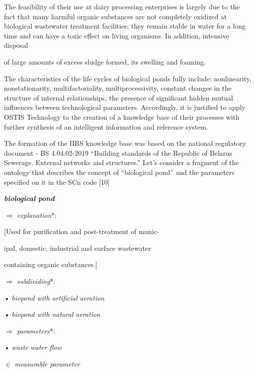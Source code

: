 \documentclass[10pt,final]{article}
\begin{document}
\begin{multicols}{2}
The feasibility of their use at dairy processing enterprises is largely due to the fact that many harmful organic
substances are not completely oxidized at biological
wastewater treatment facilities; they remain stable in
water for a long time and can have a toxic effect on
living organisms. In addition, intensive disposal

\columnbreak
\noindent of large amounts of excess sludge formed, its swelling
and foaming.

The characteristics of the life cycles of biological
ponds fully include: nonlinearity, nonstationarity, multifactoriality, multiprocessivity, constant changes in the
structure of internal relationships, the presence of significant hidden mutual influences between technological
parameters. Accordingly, it is justified to apply OSTIS
Technology to the creation of a knowledge base of
their processes with further synthesis of an intelligent
information and reference system.

The formation of the IIRS knowledge base was based
on the national regulatory document - BS 4.04.02-2019
“Building standards of the Republic of Belarus Sewerage. External networks and structures.” Let’s consider a
fragment of the ontology that describes the concept of
“biological pond” and the parameters specified on it in
the SCn code [10]

\vspace{0.5cm}
\noindent 
\textbf{\textit{biological pond}}

\noindent 
\(\Rightarrow\)  
\textit{explanation}*:

[Used for purification and post-treatment of munic-

 ipal, domestic, industrial and surface wastewater 
 
 containing organic substances.]
 
\noindent 
\(\Rightarrow\) 
\textit{subdividing}*:

\textbf{\textbraceleft}\setlength{\parindent}{0.85cm}
\textit{• biopond with artificial aeration}

\textit{• biopond with natural aeration}

\setlength{\parindent}{0.6cm}
\textbf{\textbraceright}

\setlength\itemsep{0pt} \noindent
\(\Rightarrow\)
\textit{ parameters}*:

\textbf{\textbraceleft}
\textit{• waste water flow}

\hspace{0.4cm}$\in$
\textit{measurable parameter}


\end{multicols}
\end{document}
